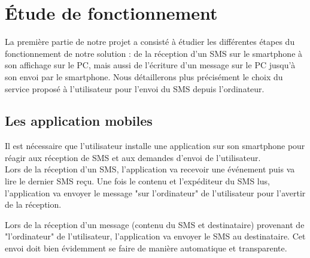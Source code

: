 \cleardoublepage



\chapter{Étude de fonctionnement}

La première partie de notre projet a consisté à étudier les différentes étapes du fonctionnement de notre solution : de la réception d'un SMS sur le smartphone à son affichage sur le PC, mais aussi de l'écriture d'un message sur le PC jusqu'à son envoi par le smartphone.
Nous détaillerons plus précisément le choix du service proposé à l'utilisateur pour l'envoi du SMS depuis l'ordinateur.
\\






\section{Les application mobiles}

Il est nécessaire que l'utilisateur installe une application sur son smartphone pour réagir aux réception de SMS et aux demandes d'envoi de l'utilisateur.
\\


Lors de la réception d'un SMS, l'application va recevoir une événement puis va lire le dernier SMS reçu.
Une fois le contenu et l'expéditeur du SMS lus, l'application va envoyer le message "sur l'ordinateur" de l'utilisateur pour l'avertir de la réception.

Lors de la réception d'un message (contenu du SMS et destinataire) provenant de "l'ordinateur" de l'utilisateur, l'application va envoyer le SMS au destinataire.
Cet envoi doit bien évidemment se faire de manière automatique et transparente.

